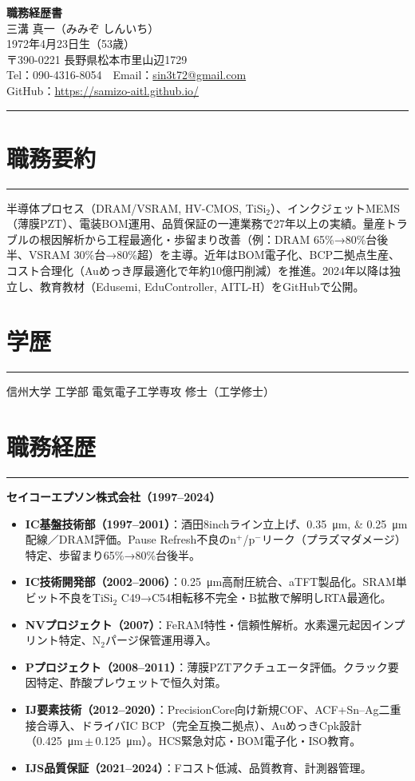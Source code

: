 \documentclass[11pt,ja=standard,engine=luatex]{bxjsarticle}
\newcommand{\cvsection}[1]{\section*{#1}\vspace{-0.3em}\hrule\vspace{0.5em}}
\begin{document}
\begin{center}
{\Huge \textbf{職務経歴書}} \\[1.2em]
{\Large 三溝 真一（みみぞ しんいち）} \\[0.5em]
1972年4月23日生（53歳） \\[0.3em]
〒390-0221 長野県松本市里山辺1729 \\[0.3em]
Tel：090-4316-8054　Email：\href{mailto:sin3t72@gmail.com}{sin3t72@gmail.com} \\[0.3em]
GitHub：\href{https://samizo-aitl.github.io/}{https://samizo-aitl.github.io/}
\end{center}

\vspace{1em}
\hrule
\vspace{1em}

\cvsection{職務要約}
半導体プロセス（DRAM/VSRAM, HV-CMOS, TiSi$_2$）、インクジェットMEMS（薄膜PZT）、電装BOM運用、品質保証の一連業務で27年以上の実績。量産トラブルの根因解析から工程最適化・歩留まり改善（例：DRAM 65\%→80\%台後半、VSRAM 30\%台→80\%超）を主導。近年はBOM電子化、BCP二拠点生産、コスト合理化（Auめっき厚最適化で年約10億円削減）を推進。2024年以降は独立し、教育教材（Edusemi, EduController, AITL-H）をGitHubで公開。

\cvsection{学歴}
信州大学 工学部 電気電子工学専攻 修士（工学修士）

\cvsection{職務経歴}
\textbf{セイコーエプソン株式会社（1997--2024）}

\begin{itemize}
  \item \textbf{IC基盤技術部（1997--2001）}：酒田8inchライン立上げ、\SIlist{0.35;0.25}{\micro\metre}配線／DRAM評価。Pause Refresh不良のn$^+$/p$^-$リーク（プラズマダメージ）特定、歩留まり65\%→80\%台後半。
  \item \textbf{IC技術開発部（2002--2006）}：\SI{0.25}{\micro\metre}高耐圧統合、aTFT製品化。SRAM単ビット不良をTiSi$_2$ C49→C54相転移不完全・B拡散で解明しRTA最適化。
  \item \textbf{NVプロジェクト（2007）}：FeRAM特性・信頼性解析。水素還元起因インプリント特定、N$_2$パージ保管運用導入。
  \item \textbf{Pプロジェクト（2008--2011）}：薄膜PZTアクチュエータ評価。クラック要因特定、酢酸プレウェットで恒久対策。
  \item \textbf{IJ要素技術（2012--2020）}：PrecisionCore向け新規COF、ACF+Sn--Ag二重接合導入、ドライバIC BCP（完全互換二拠点）、AuめっきCpk設計（\SI{0.425}{\micro\metre}\,\(\pm\)\,\SI{0.125}{\micro\metre}）。HCS緊急対応・BOM電子化・ISO教育。
  \item \textbf{IJS品質保証（2021--2024）}：Fコスト低減、品質教育、計測器管理。
\end{itemize}
\end{document}
